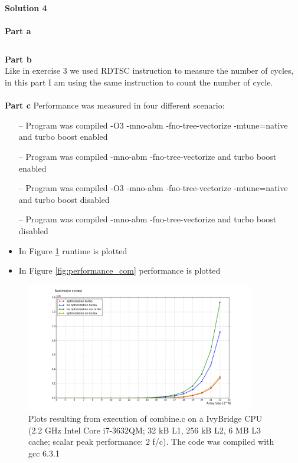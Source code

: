 \documentclass[letterpaper, 11pt]{article}
\begin{document}
\textbf{Solution 4}\\ \\
\textbf{Part a}
\inputminted[frame=2]{c}{sol.c}
\textbf{Part b} \\
Like in exercise 3 we used RDTSC instruction to measure the number of cycles, in this part I am using the same instruction to count the number of cycle. \\ \\
\textbf{Part c} 
Performance was measured in four different scenario:
\begin{itemize}
\item[--] Program was compiled -O3 -mno-abm -fno-tree-vectorize -mtune=native and turbo boost enabled
\item[--] Program was compiled -mno-abm -fno-tree-vectorize and turbo boost enabled
\item[--] Program was compiled -O3 -mno-abm -fno-tree-vectorize -mtune=native and turbo boost disabled
\item[--] Program was compiled -mno-abm -fno-tree-vectorize and turbo boost disabled
\end{itemize}
\begin{itemize}
\item In Figure \ref{fig:runtime_com} runtime is plotted
\item In Figure \ref{fig:performance_com} performance is plotted
\end{itemize}
\begin{figure}[h!]
    \centering
    \includegraphics[width=100mm]{sol_4_1}
    \caption{Plots resulting from execution of combine.c on a IvyBridge CPU (2.2 GHz Intel Core i7-3632QM; 32 kB L1, 256 kB L2, 6 MB L3 cache; scalar peak performance: 2 f/c). The code was compiled with gcc 6.3.1}
    \label{fig:runtime_com}
\end{figure}
\end{document}
